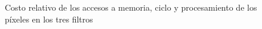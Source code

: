 \documentclass[a4paper]{article}
\begin{document}
\begin{figure}[h]       
    \hspace{10px}
    \hspace{10px}
    \caption{Costo relativo de los accesos a memoria, ciclo y procesamiento de los píxeles en los tres filtros}
\end{figure}
\end{document}
